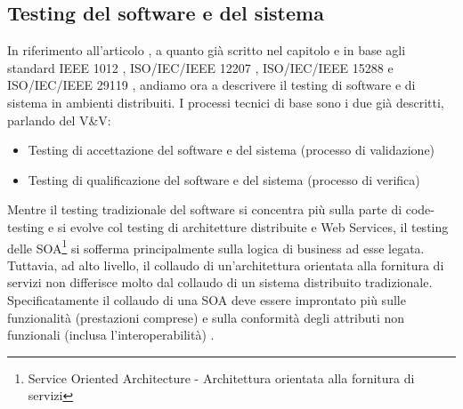 \documentclass[../main.tex]{subfiles}
\begin{document}
\subsection{Testing del software e del sistema}
In riferimento all'articolo \cite{disttest}, a quanto già scritto nel capitolo e in base agli standard IEEE 1012 \cite{ieee1012}, ISO/IEC/IEEE 12207 \cite{iso12207}, ISO/IEC/IEEE 15288 \cite{iso15288} e ISO/IEC/IEEE 29119 \cite{iso29119}, andiamo ora a descrivere il testing di software e di sistema in ambienti distribuiti.
I processi tecnici di base sono i due già descritti, parlando del V\&V:
\begin{itemize}
\item Testing di accettazione del software e del sistema (processo di validazione)
\item Testing di qualificazione del software e del sistema (processo di verifica)
\end{itemize}
Mentre il testing tradizionale del software si concentra più sulla parte di code-testing e si evolve col testing di architetture distribuite e Web Services, il testing delle SOA\footnote{Service Oriented Architecture - Architettura orientata alla fornitura di servizi} si sofferma principalmente sulla logica di business \cite{disttestSoaTest1} ad esse legata. Tuttavia, ad alto livello, il collaudo di un'architettura orientata alla fornitura di servizi non differisce molto dal collaudo di un sistema distribuito tradizionale.
Specificatamente il collaudo di una SOA deve essere improntato più sulle funzionalità (prestazioni comprese) e sulla conformità degli attributi non funzionali (inclusa l'interoperabilità) \cite{disttestSoaTest2}.
\end{document}
